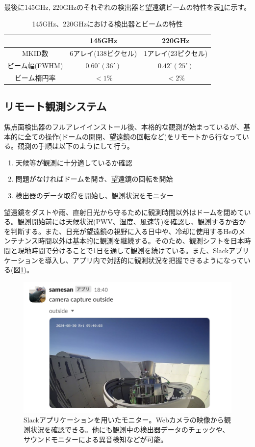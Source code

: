 最後に145GHz, 220GHzのそれぞれの検出器と望遠鏡ビームの特性を表\ref{mkid_table}に示す。

\begin{table}[htbp]
  \centering
  \caption{145GHz、220GHzにおける検出器とビームの特性\cite{choi_doctor}}
  \vspace{3mm}
  \begin{tabular}{ccc} \hline
    & 145GHz & 220GHz \\ \hline
    MKID数 & 6アレイ(138ピクセル) & 1アレイ(23ピクセル)\\
    ビーム幅(FWHM) & $0.60^{\circ}(36')$ & $0.42^{\circ}(25')$\\
    ビーム楕円率 & $ < 1\% $ & $ < 2\% $\\ \hline
  \end{tabular}
  \label{mkid_table}
\end{table}

\subsection{リモート観測システム}
焦点面検出器のフルアレイインストール後、本格的な観測が始まっているが、基本的に全ての操作(ドームの開閉、望遠鏡の回転など)をリモートから行なっている。観測の手順は以下のようにして行う。
\begin{enumerate}
  \item 天候等が観測に十分適しているか確認
  \item 問題がなければドームを開き、望遠鏡の回転を開始
  \item 検出器のデータ取得を開始し、観測状況をモニター
\end{enumerate}
望遠鏡をダストや雨、直射日光から守るために観測時間以外はドームを閉めている。観測開始前には天候状況(PWV、湿度、風速等)を確認し、観測するか否かを判断する。また、日光が望遠鏡の視野に入る日中や、冷却に使用するHeのメンテナンス時間以外は基本的に観測を継続する。そのため、観測シフトを日本時間と現地時間で分けることで1日を通して観測を続けている。また、Slackアプリケーションを導入し、アプリ内で対話的に観測状況を把握できるようになっている(図\ref{samesan})。

\begin{figure}[htbp]
  \centering
  \includegraphics[width=0.6\columnwidth]{3_GB/figs/webcam.png}
  \caption{Slackアプリケーションを用いたモニター。Webカメラの映像から観測状況を確認できる。他にも観測中の検出器データのチェックや、サウンドモニターによる異音検知などが可能。}
  \label{samesan}
\end{figure}

